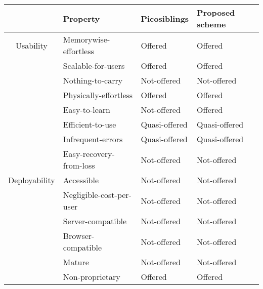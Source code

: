 \begin{table}
    \begin{tabular}{c|l|l|l}
    ~             & Property                                & Picosiblings  						& Proposed scheme \\ \hline
    Usability     & Memorywise-effortless                   & \cellcolor{green!25}Offered       	& \cellcolor{green!25}Offered         \\
    ~             & Scalable-for-users                      & \cellcolor{green!25}Offered       	& \cellcolor{green!25}Offered         \\
    ~             & Nothing-to-carry                        & \cellcolor{red!25}Not-offered   		& \cellcolor{red!25}Not-offered     \\
    ~             & Physically-effortless                   & \cellcolor{green!25}Offered       	& \cellcolor{green!25}Offered         \\
    ~             & Easy-to-learn                           & \cellcolor{red!25}Not-offered   		& \cellcolor{green!25}Offered         \\
    ~             & Efficient-to-use                        & \cellcolor{yellow!25}Quasi-offered 	& \cellcolor{yellow!25}Quasi-offered   \\
    ~             & Infrequent-errors                       & \cellcolor{yellow!25}Quasi-offered 	& \cellcolor{yellow!25}Quasi-offered   \\
    ~             & Easy-recovery-from-loss                 & \cellcolor{red!25}Not-offered   		& \cellcolor{red!25}Not-offered     \\ \hline
    Deployability & Accessible                              & \cellcolor{red!25}Not-offered   		& \cellcolor{red!25}Not-offered         \\
    ~             & Negligible-cost-per-user                & \cellcolor{red!25}Not-offered   		& \cellcolor{red!25}Not-offered     \\
    ~             & Server-compatible                       & \cellcolor{red!25}Not-offered   		& \cellcolor{red!25}Not-offered     \\
    ~             & Browser-compatible                      & \cellcolor{red!25}Not-offered   		& \cellcolor{red!25}Not-offered     \\
    ~             & Mature                                  & \cellcolor{red!25}Not-offered   		& \cellcolor{red!25}Not-offered     \\
    ~             & Non-proprietary                         & \cellcolor{green!25}Offered       	& \cellcolor{green!25}Offered         \\ \hline

\end{tabular}
\end{table}
